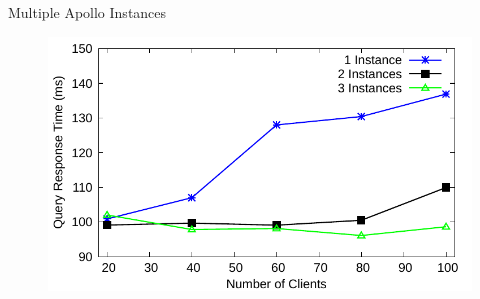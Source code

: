 \documentclass[10pt]{beamer}
\begin{document}
\begin{frame}[fragile]{Multiple Apollo Instances}
    \begin{figure}
        \center
        \includegraphics[scale=0.7]{apollo_scalability_curve}
    \end{figure}
\end{frame}

\begin{frame}[allowframebreaks]
    
    
\end{frame}
\end{document}
